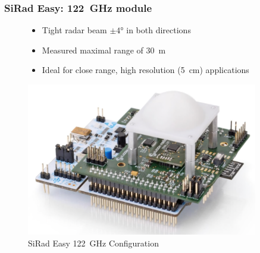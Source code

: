 \documentclass[aspectratio=169]{beamer}
\begin{document}
\begin{frame}[fragile]
  \frametitle{SiRad Easy: 122~GHz module}
  \begin{figure}[!htb]
    \begin{minipage}{0.48\textwidth}
      \begin{itemize}
        \item Tight radar beam $\pm 4$° in both directions
        \item Measured maximal range of 30~m
        \item Ideal for close range, high resolution (5~cm) applications
      \end{itemize}
    \end{minipage}\hfill
    \begin{minipage}{0.48\textwidth}
      \centering
      \includegraphics[width=0.9\textwidth]{../img/sirad122.png}

      \caption{SiRad Easy 122~GHz Configuration }
    \end{minipage}
  \end{figure}
\end{frame}
\end{document}
